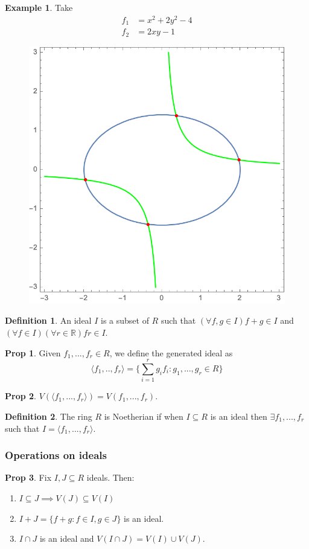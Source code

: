 \documentclass{article}
\theoremstyle{definition}
\newtheorem*{prop}{Prop}
\newtheorem*{defn}{Definition}
\newtheorem{ex}{Example}
\newcommand{\R}{\mathbb{R}}
\begin{document}
\begin{ex}
	Take
	\begin{align*}
		f_{1}&=x^2+2y^2-4\\
		f_{2}&=2xy-1
	\end{align*}
	\begin{figure}[H]
		\centering
		\includegraphics[width=0.5\linewidth]{5}
		\caption*{}
		\label{fig:5}
	\end{figure}
	
\end{ex}
\begin{defn}
	An ideal $I$ is a subset of $R$ such that $(\forall f,g\in I) f+g\in I$ and $(\forall f\in I)(\forall r\in \R)fr\in I$.
\end{defn}
\begin{prop}
	Given $f_1,...,f_r\in R$, we define the generated ideal as $$\langle f_1,..,f_r\rangle=\{\sum_{i=1}^rg_if_i:g_1,...,g_r\in R\}$$
\end{prop}
\begin{prop}
	$V(\langle f_1,...,f_r\rangle)=V(f_1,...,f_r)$.
\end{prop}
\begin{defn}
	The ring $R$ is Noetherian if when $I\subseteq R$ is an ideal then $\exists f_1,...,f_r$ such that $I=\langle f_1,...,f_r\rangle$.
\end{defn}
\subsubsection{Operations on ideals}
\begin{prop}Fix $I,J\subseteq R$ ideals. Then:
\begin{enumerate}
	\item $I\subseteq J\implies V(J)\subseteq V(I)$
	\item $I+J=\{f+g:f\in I,g\in J\}$ is an ideal.
	\item $I\cap J$ is an ideal and $V(I\cap J)=V(I)\cup V(J)$.
\end{enumerate}
\end{prop}
\end{document}

